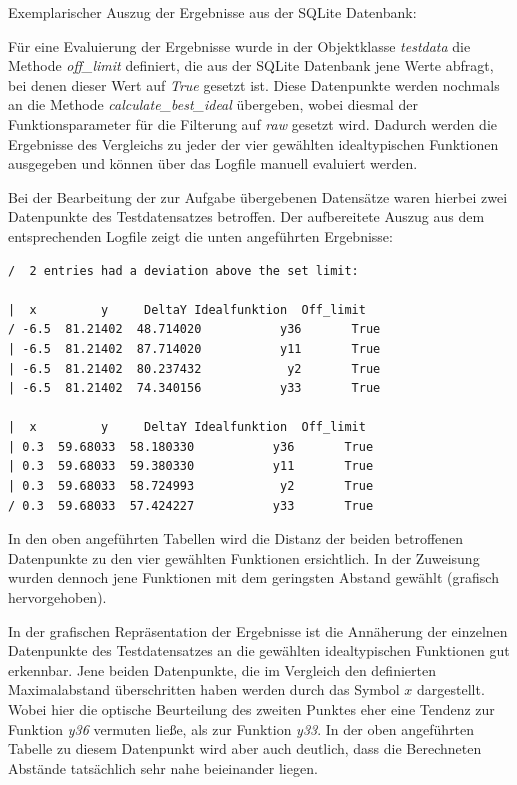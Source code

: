 Exemplarischer Auszug der Ergebnisse aus der SQLite Datenbank:



Für eine Evaluierung der Ergebnisse wurde in der Objektklasse \emph{testdata} die Methode \emph{off\_limit} definiert, die aus der SQLite Datenbank jene Werte abfragt, bei denen dieser Wert auf \emph{True} gesetzt ist. Diese Datenpunkte werden nochmals an die Methode \emph{calculate\_best\_ideal} übergeben, wobei diesmal der Funktionsparameter für die Filterung auf \emph{raw} gesetzt wird. Dadurch werden die Ergebnisse des Vergleichs zu jeder der vier gewählten idealtypischen Funktionen ausgegeben und können über das Logfile manuell evaluiert werden.

Bei der Bearbeitung der zur Aufgabe übergebenen Datensätze waren hierbei zwei Datenpunkte des Testdatensatzes betroffen. Der aufbereitete Auszug aus dem entsprechenden Logfile zeigt die unten angeführten Ergebnisse:

\begin{lstlisting}[caption={Datenpunkte mit überschrittenem Maximalabstand},
				   label=offlimit]
/  2 entries had a deviation above the set limit:

|  x         y     DeltaY Idealfunktion  Off_limit
/ -6.5  81.21402  48.714020           y36       True
| -6.5  81.21402  87.714020           y11       True
| -6.5  81.21402  80.237432            y2       True
| -6.5  81.21402  74.340156           y33       True

|  x         y     DeltaY Idealfunktion  Off_limit
| 0.3  59.68033  58.180330           y36       True
| 0.3  59.68033  59.380330           y11       True
| 0.3  59.68033  58.724993            y2       True
/ 0.3  59.68033  57.424227           y33       True
\end{lstlisting}

In den oben angeführten Tabellen wird die Distanz der beiden betroffenen Datenpunkte zu den vier gewählten Funktionen ersichtlich. In der Zuweisung wurden dennoch jene Funktionen mit dem geringsten Abstand gewählt (grafisch hervorgehoben).

In der grafischen Repräsentation der Ergebnisse ist die Annäherung der einzelnen Datenpunkte des Testdatensatzes an die gewählten idealtypischen Funktionen gut erkennbar. Jene beiden Datenpunkte, die im Vergleich den definierten Maximalabstand überschritten haben werden durch das Symbol $x$ dargestellt. Wobei hier die optische Beurteilung des zweiten Punktes eher eine Tendenz zur Funktion \emph{y36} vermuten ließe, als zur Funktion \emph{y33}. In der oben angeführten Tabelle zu diesem Datenpunkt wird aber auch deutlich, dass die Berechneten Abstände tatsächlich sehr nahe beieinander liegen.

